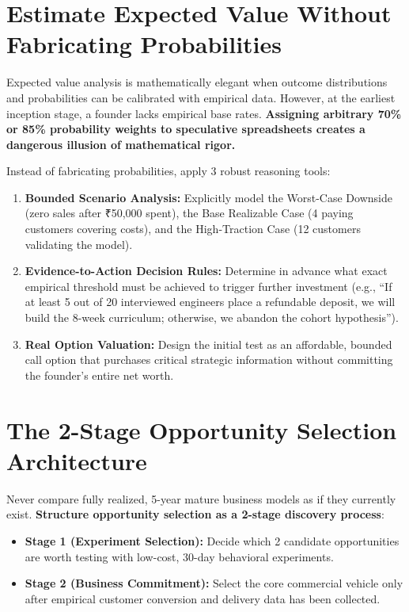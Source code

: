 \section{Estimate Expected Value Without Fabricating Probabilities}

Expected value analysis is mathematically elegant when outcome distributions and probabilities can be calibrated with empirical data. However, at the earliest inception stage, a founder lacks empirical base rates. \textbf{Assigning arbitrary 70\% or 85\% probability weights to speculative spreadsheets creates a dangerous illusion of mathematical rigor.}

Instead of fabricating probabilities, apply 3 robust reasoning tools:
\begin{enumerate}[leftmargin=12pt,itemsep=2pt,topsep=1pt,parsep=0pt]
  \item \textbf{Bounded Scenario Analysis:} Explicitly model the Worst-Case Downside (zero sales after ₹50,000 spent), the Base Realizable Case (4 paying customers covering costs), and the High-Traction Case (12 customers validating the model).
  \item \textbf{Evidence-to-Action Decision Rules:} Determine in advance what exact empirical threshold must be achieved to trigger further investment (e.g., ``If at least 5 out of 20 interviewed engineers place a refundable deposit, we will build the 8-week curriculum; otherwise, we abandon the cohort hypothesis'').
  \item \textbf{Real Option Valuation:} Design the initial test as an affordable, bounded call option that purchases critical strategic information without committing the founder's entire net worth.
\end{enumerate}

\section{The 2-Stage Opportunity Selection Architecture}

Never compare fully realized, 5-year mature business models as if they currently exist. \textbf{Structure opportunity selection as a 2-stage discovery process}:

\begin{itemize}[leftmargin=12pt,itemsep=2pt,topsep=1pt]
  \item \textbf{Stage 1 (Experiment Selection):} Decide which 2 candidate opportunities are worth testing with low-cost, 30-day behavioral experiments.
  \item \textbf{Stage 2 (Business Commitment):} Select the core commercial vehicle only after empirical customer conversion and delivery data has been collected.
\end{itemize}

